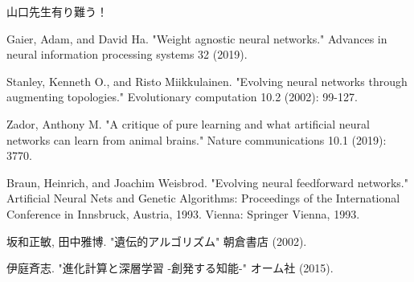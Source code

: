\documentclass[12pt, dvipdfmx]{jarticle}
\begin{document}

\tableofcontents %
\clearpage %



\clearpage


\clearpage

山口先生有り難う！ %

\begin{thebibliography}{99} %
     Gaier, Adam, and David Ha. "Weight agnostic neural networks." Advances in neural information processing systems 32 (2019).

     Stanley, Kenneth O., and Risto Miikkulainen. "Evolving neural networks through augmenting topologies." Evolutionary computation 10.2 (2002): 99-127.

     Zador, Anthony M. "A critique of pure learning and what artificial neural networks can learn from animal brains." Nature communications 10.1 (2019): 3770.

     Braun, Heinrich, and Joachim Weisbrod. "Evolving neural feedforward networks." Artificial Neural Nets and Genetic Algorithms: Proceedings of the International Conference in Innsbruck, Austria, 1993. Vienna: Springer Vienna, 1993.

     坂和正敏, 田中雅博. "遺伝的アルゴリズム" 朝倉書店 (2002).

     伊庭斉志. "進化計算と深層学習 -創発する知能-" オーム社 (2015). 
\end{thebibliography}
\end{document}
